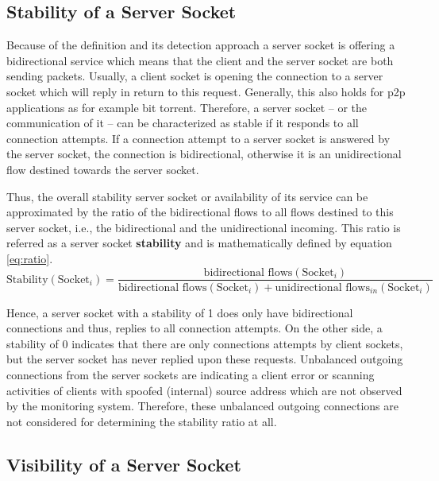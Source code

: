 \subsection{Stability of a Server Socket}
Because of the definition and its detection approach a \gls{server socket} is offering a bidirectional service which means that the client and the \gls{server socket} are both sending packets. 
Usually, a client socket is opening the connection to a \gls{server socket} which will reply in return to this request. 
Generally, this also holds for \gls{p2p} applications as for example bit torrent. Therefore, a \gls{server socket} -- or the communication of it -- can be characterized as stable if it responds to all connection attempts. 
If a connection attempt to a \gls{server socket} is answered by the \gls{server socket}, the connection is bidirectional, otherwise it is an unidirectional flow destined towards the \gls{server socket}.

Thus, the overall stability \gls{server socket} or availability of its service can be approximated by the ratio of the bidirectional flows to all flows destined to this \gls{server socket}, i.e., the bidirectional and the unidirectional incoming. 
This ratio is referred as a \gls{server socket} \textbf{stability} and is mathematically defined by equation \ref{eq:ratio}.
\begin{equation}
	\text{Stability}(\text{Socket}_i) = \frac{\text{bidirectional flows}(\text{Socket}_i)}{\text{bidirectional flows}(\text{Socket}_i) + \text{unidirectional flows}_{in}(\text{Socket}_i)}
	\label{eq:ratio}
\end{equation}

Hence, a \gls{server socket} with a stability of 1 does only have bidirectional connections and thus, replies to all connection attempts. 
On the other side, a stability of 0 indicates that there are only connections attempts by client sockets, but the \gls{server socket} has never replied upon these requests. 
Unbalanced outgoing connections from the \glspl{server socket} are indicating a client error or scanning activities of clients with spoofed (internal) source address which are not observed by the monitoring system. 
Therefore, these unbalanced outgoing connections are not considered for determining the stability ratio at all.

\subsection{Visibility of a Server Socket\label{subsection:visibility}}

